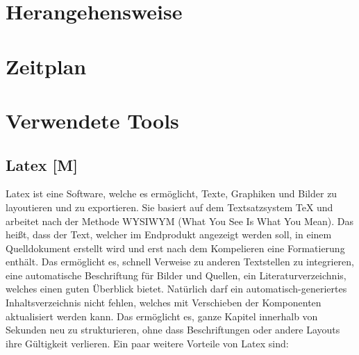 \section{Herangehensweise}
 
 
\section{Zeitplan}
 
 
\section{Verwendete Tools}
 
 
 
\subsection{Latex [M]} 

Latex ist eine Software, welche es ermöglicht, Texte, Graphiken und Bilder zu layoutieren und zu exportieren. Sie basiert auf dem Textsatzsystem TeX und arbeitet nach der Methode WYSIWYM (What You See Is What You Mean). Das heißt, dass der Text, welcher im Endprodukt angezeigt werden soll, in einem Quelldokument erstellt wird und erst nach dem Kompelieren eine Formatierung enthält. Das ermöglicht es, schnell Verweise zu anderen Textstellen zu integrieren, eine automatische Beschriftung für Bilder und Quellen, ein Literaturverzeichnis, welches einen guten Überblick bietet. Natürlich darf ein automatisch-generiertes Inhaltsverzeichnis nicht fehlen, welches mit Verschieben der Komponenten aktualisiert werden kann. Das ermöglicht es, ganze Kapitel innerhalb von Sekunden neu zu strukturieren, ohne dass Beschriftungen oder andere Layouts ihre Gültigkeit verlieren. Ein paar weitere Vorteile von Latex sind:  

